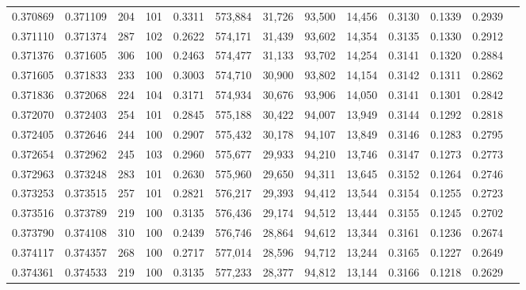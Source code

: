 \begin{tabular}{rrrrrrrrrrrrr}
0.370869 & 0.371109 &   204 & 101 &                                     0.3311 & 573,884 &  31,726 &  93,500 &  14,456 & 0.3130 & 0.1339 & 0.2939 \\
0.371110 & 0.371374 &   287 & 102 &                                     0.2622 & 574,171 &  31,439 &  93,602 &  14,354 & 0.3135 & 0.1330 & 0.2912 \\
0.371376 & 0.371605 &   306 & 100 &                                     0.2463 & 574,477 &  31,133 &  93,702 &  14,254 & 0.3141 & 0.1320 & 0.2884 \\
0.371605 & 0.371833 &   233 & 100 &                                     0.3003 & 574,710 &  30,900 &  93,802 &  14,154 & 0.3142 & 0.1311 & 0.2862 \\
0.371836 & 0.372068 &   224 & 104 &                                     0.3171 & 574,934 &  30,676 &  93,906 &  14,050 & 0.3141 & 0.1301 & 0.2842 \\
0.372070 & 0.372403 &   254 & 101 &                                     0.2845 & 575,188 &  30,422 &  94,007 &  13,949 & 0.3144 & 0.1292 & 0.2818 \\
0.372405 & 0.372646 &   244 & 100 &                                     0.2907 & 575,432 &  30,178 &  94,107 &  13,849 & 0.3146 & 0.1283 & 0.2795 \\
0.372654 & 0.372962 &   245 & 103 &                                     0.2960 & 575,677 &  29,933 &  94,210 &  13,746 & 0.3147 & 0.1273 & 0.2773 \\
0.372963 & 0.373248 &   283 & 101 &                                     0.2630 & 575,960 &  29,650 &  94,311 &  13,645 & 0.3152 & 0.1264 & 0.2746 \\
0.373253 & 0.373515 &   257 & 101 &                                     0.2821 & 576,217 &  29,393 &  94,412 &  13,544 & 0.3154 & 0.1255 & 0.2723 \\
0.373516 & 0.373789 &   219 & 100 &                                     0.3135 & 576,436 &  29,174 &  94,512 &  13,444 & 0.3155 & 0.1245 & 0.2702 \\
0.373790 & 0.374108 &   310 & 100 &                                     0.2439 & 576,746 &  28,864 &  94,612 &  13,344 & 0.3161 & 0.1236 & 0.2674 \\
0.374117 & 0.374357 &   268 & 100 &                                     0.2717 & 577,014 &  28,596 &  94,712 &  13,244 & 0.3165 & 0.1227 & 0.2649 \\
0.374361 & 0.374533 &   219 & 100 &                                     0.3135 & 577,233 &  28,377 &  94,812 &  13,144 & 0.3166 & 0.1218 & 0.2629 \\

\end{tabular}
